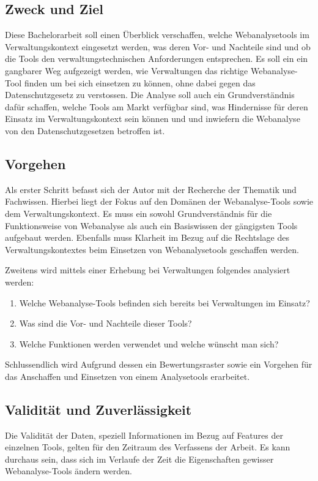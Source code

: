 \subsection{Zweck und Ziel}

Diese Bachelorarbeit soll einen Überblick verschaffen, welche Webanalysetools im Verwaltungskontext eingesetzt werden, was deren Vor- und Nachteile sind und ob die Tools den verwaltungstechnischen Anforderungen entsprechen. Es soll ein ein gangbarer Weg aufgezeigt werden, wie Verwaltungen das richtige Webanalyse-Tool finden um bei sich einsetzen zu können, ohne dabei gegen das Datenschutzgesetz zu verstossen. Die Analyse soll auch ein Grundverständnis dafür schaffen, welche Tools am Markt verfügbar sind, was Hindernisse für deren Einsatz im Verwaltungskontext sein können und und inwiefern die Webanalyse von den Datenschutzgesetzen betroffen ist. 


\subsection{Vorgehen}

Als erster Schritt befasst sich der Autor mit der Recherche der Thematik und Fachwissen. Hierbei liegt der Fokus auf den Domänen der Webanalyse-Tools sowie dem Verwaltungskontext. Es muss ein sowohl Grundverständnis für die Funktionsweise von Webanalyse als auch ein Basiswissen der gängigsten Tools aufgebaut werden. Ebenfalls muss Klarheit im Bezug auf die Rechtslage des Verwaltungskontextes beim Einsetzen von Webanalysetools geschaffen werden.

Zweitens wird mittels einer Erhebung bei Verwaltungen folgendes analysiert werden:

\begin{enumerate}
    \item Welche Webanalyse-Tools befinden sich bereits bei Verwaltungen im Einsatz?
    \item Was sind die Vor- und Nachteile dieser Tools?
    \item Welche Funktionen werden verwendet und welche wünscht man sich?
\end{enumerate}

Schlussendlich wird Aufgrund dessen ein Bewertungsraster sowie ein Vorgehen für das Anschaffen und Einsetzen von einem Analysetools erarbeitet. 

\subsection{Validität und Zuverlässigkeit}
Die Validität der Daten, speziell Informationen im Bezug auf Features der einzelnen Tools, gelten für den Zeitraum des Verfassens der Arbeit. Es kann durchaus sein, dass sich im Verlaufe der Zeit die Eigenschaften gewisser Webanalyse-Tools ändern werden. 

